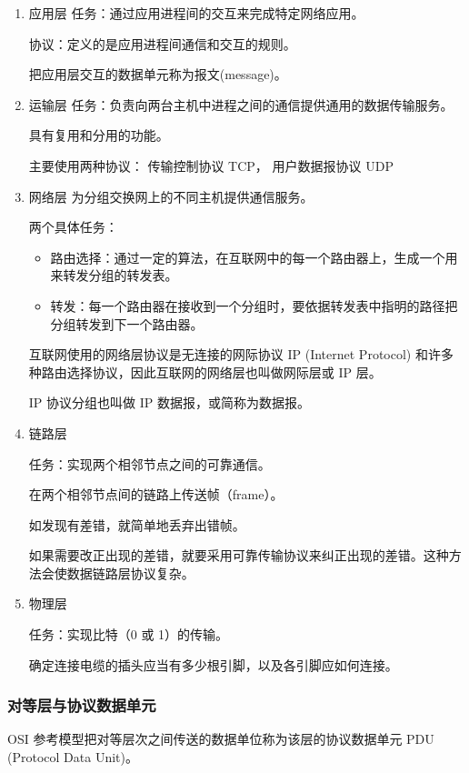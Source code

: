 \documentclass[11pt]{article}
\begin{document}
\begin{enumerate}
\item 应用层
\label{sec:org027d11d}
任务：通过应用进程间的交互来完成特定网络应用。

协议：定义的是应用进程间通信和交互的规则。

把应用层交互的数据单元称为报文(message)。

\item 运输层
\label{sec:orgc3620a1}
任务：负责向两台主机中进程之间的通信提供通用的数据传输服务。

具有复用和分用的功能。

主要使用两种协议： 传输控制协议 TCP， 用户数据报协议 UDP

\item 网络层
\label{sec:org7e66dc0}
为分组交换网上的不同主机提供通信服务。

两个具体任务：
\begin{itemize}
\item 路由选择：通过一定的算法，在互联网中的每一个路由器上，生成一个用来转发分组的转发表。
\item 转发：每一个路由器在接收到一个分组时，要依据转发表中指明的路径把分组转发到下一个路由器。
\end{itemize}

互联网使用的网络层协议是无连接的网际协议 IP  (Internet Protocol) 和许多种路由选择协议，因此互联网的网络层也叫做网际层或 IP 层。

IP 协议分组也叫做 IP 数据报，或简称为数据报。

\item 链路层
\label{sec:org95c0f2f}

任务：实现两个相邻节点之间的可靠通信。

在两个相邻节点间的链路上传送帧（frame）。

如发现有差错，就简单地丢弃出错帧。

如果需要改正出现的差错，就要采用可靠传输协议来纠正出现的差错。这种方法会使数据链路层协议复杂。

\item 物理层
\label{sec:org3e74c3d}

任务：实现比特（0 或 1）的传输。

确定连接电缆的插头应当有多少根引脚，以及各引脚应如何连接。
\end{enumerate}

\subsubsection{对等层与协议数据单元}
\label{sec:org5c6a1c7}
OSI 参考模型把对等层次之间传送的数据单位称为该层的协议数据单元 PDU (Protocol Data Unit)。
\end{document}
